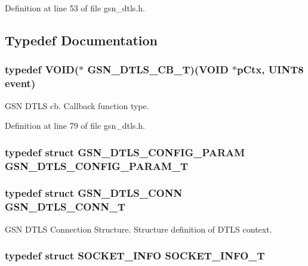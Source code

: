 Definition at line 53 of file gsn\_\-dtls.h.



\subsection{Typedef Documentation}
\hypertarget{a00487_a5d2b26f5083cf0fda1a5356fe26ad9c3}{
\subsubsection[{GSN\_\-DTLS\_\-CB\_\-T}]{\setlength{\rightskip}{0pt plus 5cm}typedef VOID($\ast$ {\bf GSN\_\-DTLS\_\-CB\_\-T})(VOID $\ast$pCtx, {\bf UINT8} event)}}
\label{a00487_a5d2b26f5083cf0fda1a5356fe26ad9c3}


GSN DTLS cb. Callback function type. 



Definition at line 79 of file gsn\_\-dtls.h.

\hypertarget{a00487_ae3680440931131b5203c5e0217bfec16}{
\subsubsection[{GSN\_\-DTLS\_\-CONFIG\_\-PARAM\_\-T}]{\setlength{\rightskip}{0pt plus 5cm}typedef struct {\bf GSN\_\-DTLS\_\-CONFIG\_\-PARAM} {\bf GSN\_\-DTLS\_\-CONFIG\_\-PARAM\_\-T}}}
\label{a00487_ae3680440931131b5203c5e0217bfec16}
\hypertarget{a00487_a00df65ee6cb0fc35ab9eb7a55d7d5aef}{
\subsubsection[{GSN\_\-DTLS\_\-CONN\_\-T}]{\setlength{\rightskip}{0pt plus 5cm}typedef struct {\bf GSN\_\-DTLS\_\-CONN} {\bf GSN\_\-DTLS\_\-CONN\_\-T}}}
\label{a00487_a00df65ee6cb0fc35ab9eb7a55d7d5aef}


GSN DTLS Connection Structure. Structure definition of DTLS context. 

\hypertarget{a00487_a8218fb3cf5e30d88bc41ef9985ff24dd}{
\subsubsection[{SOCKET\_\-INFO\_\-T}]{\setlength{\rightskip}{0pt plus 5cm}typedef struct {\bf SOCKET\_\-INFO} {\bf SOCKET\_\-INFO\_\-T}}}
\label{a00487_a8218fb3cf5e30d88bc41ef9985ff24dd}


